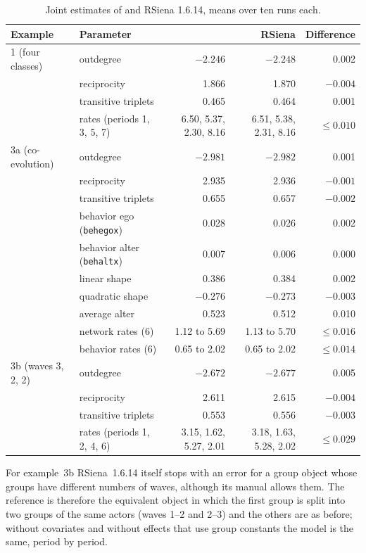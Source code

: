 \begin{table}[ht]
\centering\small
\caption{Joint estimates of \nwsaom{} and RSiena 1.6.14, means over ten runs each.}\label{tab:groups-agree}
\begin{tabular}{@{}llrrr@{}}
\toprule
Example & Parameter & \nwsaom{} & RSiena & Difference\\
\midrule
1 (four classes) & outdegree & $-2.246$ & $-2.248$ & 0.002\\
& reciprocity & 1.866 & 1.870 & $-0.004$\\
& transitive triplets & 0.465 & 0.464 & 0.001\\
& rates (periods 1, 3, 5, 7) & 6.50, 5.37, 2.30, 8.16 & 6.51, 5.38, 2.31, 8.16 & $\le 0.010$\\
\addlinespace
3a (co-evolution) & outdegree & $-2.981$ & $-2.982$ & 0.001\\
& reciprocity & 2.935 & 2.936 & $-0.001$\\
& transitive triplets & 0.655 & 0.657 & $-0.002$\\
& behavior ego (\texttt{behegox}) & 0.028 & 0.026 & 0.002\\
& behavior alter (\texttt{behaltx}) & 0.007 & 0.006 & 0.000\\
& linear shape & 0.386 & 0.384 & 0.002\\
& quadratic shape & $-0.276$ & $-0.273$ & $-0.003$\\
& average alter & 0.523 & 0.512 & 0.010\\
& network rates (6) & 1.12 to 5.69 & 1.13 to 5.70 & $\le 0.016$\\
& behavior rates (6) & 0.65 to 2.02 & 0.65 to 2.02 & $\le 0.014$\\
\addlinespace
3b (waves 3, 2, 2) & outdegree & $-2.672$ & $-2.677$ & 0.005\\
& reciprocity & 2.611 & 2.615 & $-0.004$\\
& transitive triplets & 0.553 & 0.556 & $-0.003$\\
& rates (periods 1, 2, 4, 6) & 3.15, 1.62, 5.27, 2.01 & 3.18, 1.63, 5.28, 2.02 & $\le 0.029$\\
\bottomrule
\end{tabular}
\end{table}

For example~3b RSiena~1.6.14 itself stops with an error for a group object whose groups have different numbers of waves, although its manual allows them. The reference is therefore the equivalent object in which the first group is split into two groups of the same actors (waves 1--2 and 2--3) and the others are as before; without covariates and without effects that use group constants the model is the same, period by period.

